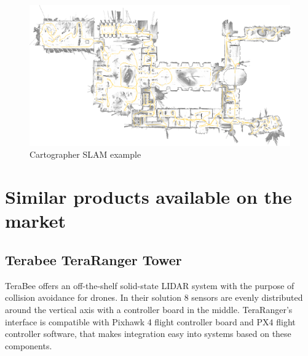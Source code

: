 \begin{figure}[!ht]
    \centering
	\includegraphics[width=140mm, keepaspectratio]{figures/cartographer_example.png}
    \caption{Cartographer SLAM example\cite{CartographerDocumentation}}
    \label{fig:cartographer_slam_example}
\end{figure}



\section{Similar products available on the market} 

\subsection{Terabee TeraRanger Tower} \label{sect:TerabeeDescription}
TeraBee offers an off-the-shelf solid-state LIDAR system with the purpose of collision avoidance for drones.
In their solution 8 sensors are evenly distributed around the vertical axis with a controller board in 
the middle. TeraRanger's interface is compatible with Pixhawk 4 flight controller board and 
PX4 flight controller software, that makes integration easy into systems based on these components.

